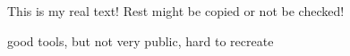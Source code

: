 This is my real text! Rest might be copied or not be checked!

good tools, but not very public, hard to recreate
